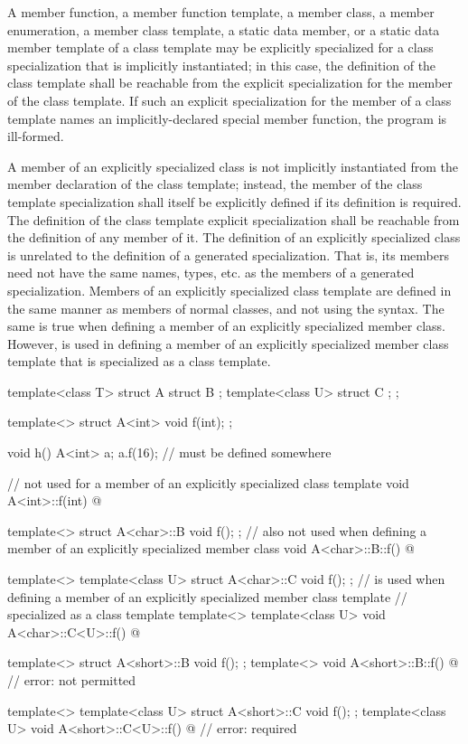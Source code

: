 \pnum
A member function, a member function template, a member class,
a member enumeration, a
member class template,
a static data member, or a static data member template of a class template
may be explicitly specialized for a class specialization that is implicitly
instantiated;
in this case, the definition of the class template shall
be reachable from the explicit specialization for the member of the class
template.
If such an explicit specialization for the member of a class template names an
implicitly-declared special member function,
the program is ill-formed.

\pnum
A member of an explicitly specialized class is not implicitly
instantiated from the member declaration of the class template;
instead, the member of the class template specialization shall itself be
explicitly defined if its definition is required.
The definition of the class template explicit specialization
shall be reachable from the definition of any member of it.
The definition of an explicitly specialized class is unrelated to the
definition of a generated specialization.
That is, its members need
not have the same names, types, etc. as the members of a generated
specialization.
Members of an explicitly specialized
class template are defined in the same manner as members of normal classes, and
not using the  syntax.
The same is true when defining a member of an explicitly specialized member
class. However,  is used in defining a member of an explicitly
specialized member class template that is specialized as a class template.
\begin{example}
\begin{codeblock}
template<class T> struct A {
  struct B { };
  template<class U> struct C { };
};

template<> struct A<int> {
  void f(int);
};

void h() {
  A<int> a;
  a.f(16);          //  must be defined somewhere
}

//  not used for a member of an explicitly specialized class template
void A<int>::f(int) { @\commentellip@ }

template<> struct A<char>::B {
  void f();
};
//  also not used when defining a member of an explicitly specialized member class
void A<char>::B::f() { @\commentellip@ }

template<> template<class U> struct A<char>::C {
  void f();
};
//  is used when defining a member of an explicitly specialized member class template
// specialized as a class template
template<>
template<class U> void A<char>::C<U>::f() { @\commentellip@ }

template<> struct A<short>::B {
  void f();
};
template<> void A<short>::B::f() { @\commentellip@ }              // error:  not permitted

template<> template<class U> struct A<short>::C {
  void f();
};
template<class U> void A<short>::C<U>::f() { @\commentellip@ }    // error:  required
\end{codeblock}
\end{example}

